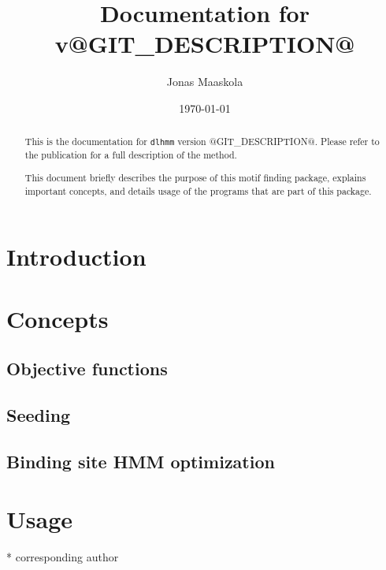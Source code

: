 \documentclass[a4paper]{article}
\title{Documentation for \dlhmm{} v@GIT_DESCRIPTION@}
\author{Jonas Maaskola}
\date{\today}
\newcommand{\dlhmm}[0]{\texttt{dlhmm}}
\begin{document}
\maketitle

\begin{abstract}
  This is the documentation for \dlhmm{} version @GIT_DESCRIPTION@.
  Please refer to the publication \cite{Maaskola2013} for a full description of the method.

  This document briefly describes the purpose of this motif finding package, explains important concepts, and details usage of the programs that are part of this package.
\end{abstract}

\tableofcontents

\section{Introduction}

\section{Concepts}
\subsection{Objective functions}
\subsection{Seeding}
\subsection{Binding site HMM optimization}

\section{Usage}

\nocite{*}


* corresponding author
\end{document}
